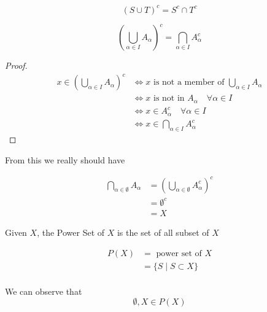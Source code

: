 \begin{note}

$$(S\cup T)^c = S^c\cap T^c$$

\end{note}



\begin{thm}
$$(\bigcup_{\alpha \in I}A_\alpha)^c = \bigcap_{\alpha \in I} A_\alpha^c$$
\end{thm}
\begin{proof}
\begin{align*}
x\in (\bigcup_{\alpha \in I}A_\alpha)^c & \iff x \text{ is not a member of } \bigcup_{\alpha \in I}A_\alpha\\
&\iff x \text{ is not in } A_\alpha \quad \forall \alpha \in I\\
&\iff x\in A_\alpha^c \quad \forall \alpha \in I\\
&\iff x\in \bigcap_{\alpha \in I} A_\alpha^c
\end{align*}
\end{proof}

\begin{note}
From this we really should have 

\begin{align*}
    \bigcap_{\alpha \in \emptyset} A_\alpha &= (\bigcup_{\alpha \in \emptyset} A_\alpha^c)^c \\ 
    & = \emptyset ^ c \\
    & = X
\end{align*}
\end{note}


\begin{defn}
Given $X$, the Power Set of $X$ is the set of all subset of $X$
\end{defn}

\begin{nota}
\begin{align*}
    P(X) & = \text{ power set of } X\\
    & = \{S \mid S\subset X\}\\
\end{align*}
\end{nota}

\begin{note}

We can observe that
    $$\emptyset ,X \in P(X)$$
    
\end{note}

